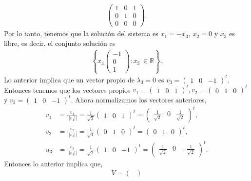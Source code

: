 \documentclass[11pt,letterpaper]{article}
\newcommand{\mR}{\mathbb{R}}
\begin{document}
\begin{enumerate}
\begin{align*}
\begin{pmatrix}
1 & 0 & 1 \\
0 & 1 & 0\\
0 & 0 & 0
\end{pmatrix}.
\end{align*}
Por lo tanto, tenemos que la solución del sistema es $x_1=-x_3,\ x_2=0$ y $x_3$ es libre, es decir, el conjunto solución es
\begin{align*}
\left\{x_3\begin{pmatrix}
-1\\
0\\
1
\end{pmatrix}: x_3 \ \in \mR \right\}.
\end{align*}
Lo anterior implica que un vector propio de $\lambda_3=0$ es 
$v_3=\begin{pmatrix}
1 & 0 & -1
\end{pmatrix}^t$. Entonces tenemos que los vectores propios $v_1=\begin{pmatrix}
1 & 0 &1 
\end{pmatrix}^t, v_2=\begin{pmatrix}
 0 & 1 & 0
\end{pmatrix}^t$ y $v_3=\begin{pmatrix}
1 & 0 & -1
\end{pmatrix}^t$. Ahora normalizamos los vectores anteriores,
\begin{align*}
v_1&= \frac{v_1}{||v_1||} =\frac{1}{\sqrt{2}} \begin{pmatrix}
1 & 0 &1 
\end{pmatrix}^t = \begin{pmatrix}
\frac{1}{\sqrt{2}}& 0 & \frac{1}{\sqrt{2}}
\end{pmatrix}^t,\\
v_2&= \frac{v_2}{||v_2||} =\frac{1}{\sqrt{1}} \begin{pmatrix}
 0 & 1 & 0
\end{pmatrix}^t = \begin{pmatrix}
 0 & 1 & 0
\end{pmatrix}^t,\\
u_3&= \frac{v_3}{||v_3||} =\frac{1}{\sqrt{2}} \begin{pmatrix}
1 & 0 & -1
\end{pmatrix}^t = \begin{pmatrix}
 \frac{1}{\sqrt{2}} & 0 & -\frac{1}{\sqrt{2}}
\end{pmatrix}^t.
\end{align*}
Entonces lo anterior implica que,
\begin{align*}
V= \begin{pmatrix}

\end{pmatrix}
\end{align*}
\end{enumerate}
\end{document}
